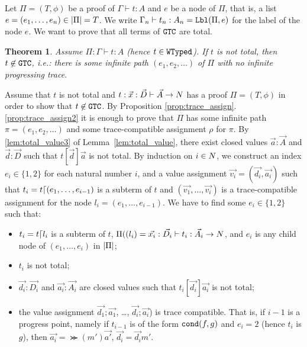 \documentclass{article}
\newtheorem{theorem}{Theorem}[section]
\newenvironment{proof}[1][Proof]{\begin{trivlist}
\item[\hskip \labelsep {\bfseries #1}]}{\end{trivlist}}
\begin{document}

Let $\Pi=(T,\phi)$ be a proof of $\Gamma\vdash t:A$ and $e$ be a node of $\Pi$, that is, a list  
$e=(e_1, \ldots, e_n) \in {|\Pi|} = T$.
We write $\Gamma_n\vdash t_n:A_n = {\tt Lbl}(\Pi,e)$ for the
 label of the node $e$. We want to prove that all terms of ${\tt GTC}$ are total.

\begin{theorem}
  Assume $\Pi:\Gamma\vdash t:A$ (hence $t\in {\tt WTyped}$).
  If $t$ is \emph{not} total, then $t \not \in {\tt GTC}$, i.e.:
  there is some infinite path $(e_1, e_2, \ldots)$ of $\Pi$ with no infinite progressing trace. 
\end{theorem}


\begin{proof}
  Assume that $t$ is not total
  and $t: \vec{x}:\vec{D}\vdash\vec{A}\rightarrow{N}$ 
  has a proof $\Pi=(T,\phi)$ in order to show that $t \not \in {\tt GTC}$.
  By Proposition \ref{prop:trace_assign}.\ref{prop:trace_assign2} it is enough to prove that
  $\Pi$ has some infinite path $\pi=(e_1, e_2, \ldots)$ 
  and some trace-compatible assignment $\rho$ for $\pi$.
  By \ref{lem:total_value3} of Lemma~\ref{lem:total_value},
  there exist closed values $\vec{a}:\vec{A}$ and $\vec{d}:\vec{D}$ such that
  $t[\vec{d}]\vec{a}$ is not total. 
  By induction on $i \in {N}$, we construct an index $e_i \in \{1,2\}$ for each natural number $i$,
  and a value assignment $\vec{v_i} = (\vec{d_i},\vec{a_i})$ such that 
  $t_i = t {\lceil} (e_1, \ldots, e_{i-1})$ is a subterm of $t$
  and $(\vec{v_1},\ldots,\vec{v_i})$ is a trace-compatible assignment for the node 
  $l_i = (e_1, \ldots, e_{i-1})$.
  We have to find some $e_{i} \in \{1,2\}$ such that:
  \begin{itemize}
  \item[(i)]
   $t_{i} = t {\lceil} l_{i}$ is a subterm of $t$,
    $\Pi( ( l_{i} ) = \vec{x_{i}}:\vec{D_{i}}\vdash t_{i} : \vec{A_{i}}\rightarrow{N}$, 
    and $e_{i}$ is any child node of $(e_1, \ldots, e_{i})$ in ${|\Pi|}$; 
  \item[(ii)]
    $t_{i}$ is not total;
  \item[(iii)]
    $\vec{d_{i}}:\vec{D_{i}}$ and $\vec{a_{i}}:\vec{A_{i}}$ are closed values
    such that $t_{i}[\vec{d_{i}}]\vec{a_{i}}$ is not total;
  \item[(iv)]
    the value assignment 
    $\vec{d_1};\vec{a_1}$, \ldots, $\vec{d_{i}};\vec{a_{i}}$) is trace compatible.
    That is, if $i-1$ is a progress point, namely if $t_{i-1}$ is of the form ${\tt cond}(f,g)$ and $e_{i}=2$ 
    (hence $t_{i}$ is $g$),
    then $\vec{a_i} = \Succ(m')\vec{a'}$, $\vec{d_{i}} = \vec{d_i}m'$.
  \end{itemize}
  

\end{proof}
\end{document}
